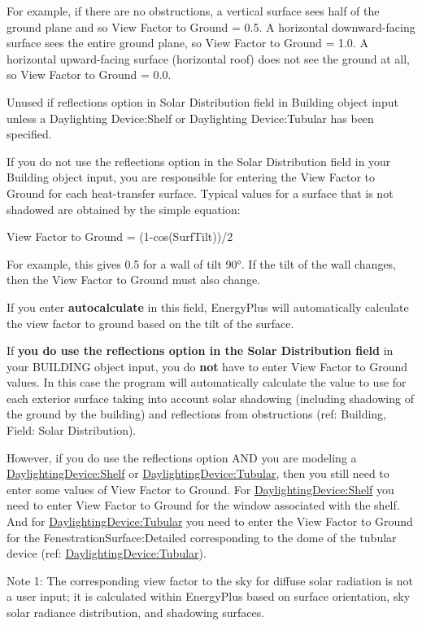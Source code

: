 For example, if there are no obstructions, a vertical surface sees half of the ground plane and so View Factor to Ground = 0.5. A horizontal downward-facing surface sees the entire ground plane, so View Factor to Ground = 1.0. A horizontal upward-facing surface (horizontal roof) does not see the ground at all, so View Factor to Ground = 0.0.

Unused if reflections option in Solar Distribution field in Building object input unless a Daylighting Device:Shelf or Daylighting Device:Tubular has been specified.

If you do not use the reflections option in the Solar Distribution field in your Building object input, you are responsible for entering the View Factor to Ground for each heat-transfer surface. Typical values for a surface that is not shadowed are obtained by the simple equation:

View Factor to Ground = (1-cos(SurfTilt))/2

For example, this gives 0.5 for a wall of tilt 90°. If the tilt of the wall changes, then the View Factor to Ground must also change.

If you enter \textbf{autocalculate} in this field, EnergyPlus will automatically calculate the view factor to ground based on the tilt of the surface.

If \textbf{you do use the reflections option in the Solar Distribution field} in your BUILDING object input, you do \textbf{not} have to enter View Factor to Ground values. In this case the program will automatically calculate the value to use for each exterior surface taking into account solar shadowing (including shadowing of the ground by the building) and reflections from obstructions (ref: Building, Field: Solar Distribution).

However, if you do use the reflections option AND you are modeling a \hyperref[daylightingdeviceshelf]{DaylightingDevice:Shelf} or \hyperref[daylightingdevicetubular]{DaylightingDevice:Tubular}, then you still need to enter some values of View Factor to Ground. For \hyperref[daylightingdeviceshelf]{DaylightingDevice:Shelf} you need to enter View Factor to Ground for the window associated with the shelf. And for \hyperref[daylightingdevicetubular]{DaylightingDevice:Tubular} you need to enter the View Factor to Ground for the FenestrationSurface:Detailed corresponding to the dome of the tubular device (ref: \hyperref[daylightingdevicetubular]{DaylightingDevice:Tubular}).

Note 1: The corresponding view factor to the sky for diffuse solar radiation is not a user input; it is calculated within EnergyPlus based on surface orientation, sky solar radiance distribution, and shadowing surfaces.

